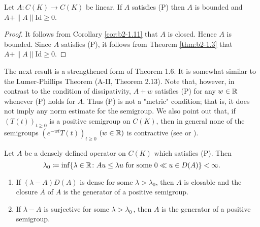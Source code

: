 \begin{corollary}\label{cor:b2-1.12}
Let $A \colon C(K) \to C(K)$ be linear.
If $A$ satisfies (P) then $A$ is bounded and $A + \|A\|\text{Id} \geq 0$.
\end{corollary}

\begin{proof}
It follows from Corollary \ref{cor:b2-1.11} that $A$ is closed.
Hence $A$ is bounded.
Since $A$ satisfies (P), it follows from Theorem \ref{thm:b2-1.3} that $A + \|A\|\text{Id} \geq 0$.
\end{proof}

The next result is a strengthened form of Theorem 1.6.
It is somewhat similar to the Lumer-Phillips Theorem (A-II, Theorem 2.13).
Note that, however, in contrast to the condition of dissipativity, $A + w$ satisfies (P) for any $w \in \mathbb{R}$ whenever (P) holds for $A$.
Thus (P) is not a "metric" condition; that is, it does not imply any norm estimate for the semigroup.
We also point out that, if $(T(t))_{t \geq 0}$ is a positive semigroup on $C(K)$, then in general none of the semigroups $(e^{-wt}T(t))_{t \geq 0}$ $(w \in \mathbb{R})$ is contractive (see \citet{battydavies:1983} or \citet{derndinger:1983}).

\begin{theorem}\label{thm:b2-1.13}
Let $A$ be a densely defined operator on $C(K)$ which satisfies (P).
Then
\[
    \lambda_{0} \coloneqq \inf\{\lambda \in \mathbb{R} \colon Au \leq \lambda u \text{ for some } 0 \ll u \in D(A)\} < \infty.
\]
\begin{enumerate}[\upshape (i)]
\item \label{thm:b2-1.13-1}
If $(\lambda - A)D(A)$ is dense for some $\lambda > \lambda_{0}$, then $A$ is closable and the closure $\overline{A}$ of $A$ is the generator of a positive semigroup.

\item \label{thm:b2-1.13-2}
If $\lambda - A$ is surjective for some $\lambda > \lambda_{0}$\,, then $A$ is the generator of a positive semigroup.
\end{enumerate}
\end{theorem}

